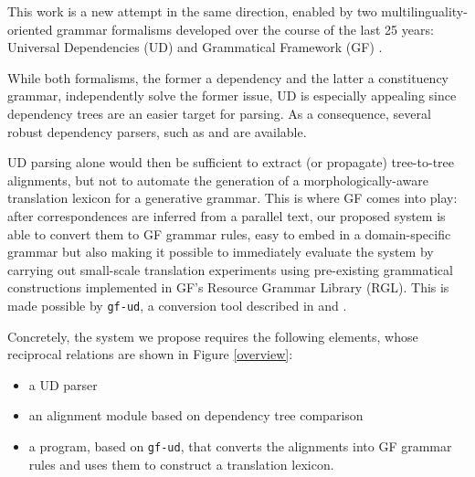 \documentclass[11pt]{article}
\begin{document}
This work is a new attempt in the same direction, enabled by two multilinguality-oriented grammar formalisms developed over the course of the last 25 years: Universal Dependencies (UD) \cite{ws-2019-universal} and Grammatical Framework (GF) \cite{ranta-etal-2020-abstract}.

While both formalisms, the former a dependency and the latter a constituency grammar, independently solve the former issue, UD is especially appealing since dependency trees are an easier target for parsing. 
As a consequence, several robust dependency parsers, such as \cite{straka-etal-2016-udpipe} and \cite{chen-manning-2014-fast} are available.

UD parsing alone would then be sufficient to extract (or propagate) tree-to-tree alignments, but not to automate the generation of a morphologically-aware translation lexicon for a generative grammar. 
This is where GF comes into play: after correspondences are inferred from a parallel text, our proposed system is able to convert them to GF grammar rules, easy to embed in a domain-specific grammar but also making it possible to immediately evaluate the system by carrying out small-scale translation experiments using pre-existing grammatical constructions implemented in GF's Resource Grammar Library (RGL).  
This is made possible by \texttt{gf-ud}, a conversion tool described in \cite{kolachina-ranta-2016-abstract} and \cite{ranta-kolachina-2017-universal}.

Concretely, the system we propose requires the following elements, whose reciprocal relations are shown in Figure \ref{overview}: \smallskip

\begin{itemize}
  \item a UD parser
  \item an alignment module based on dependency tree comparison
  \item a program, based on \texttt{gf-ud}, that converts the alignments into GF grammar rules and uses them to construct a translation lexicon.
\end{itemize} \smallskip
\end{document}
